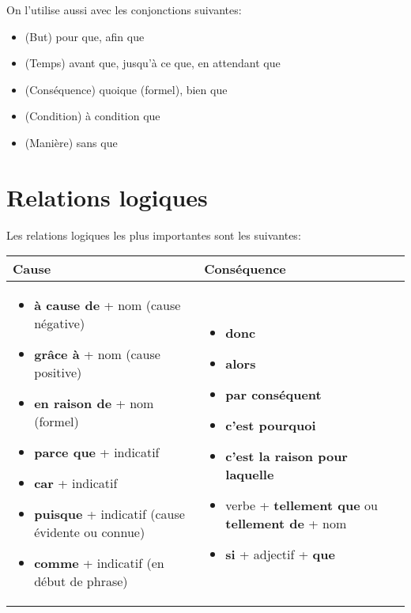 \documentclass{report}
\begin{document}
On l'utilise aussi avec les conjonctions suivantes:
\begin{itemize}
    \item (But) pour que, afin que
    \item (Temps) avant que, jusqu’à ce que, en attendant que
    \item (Conséquence) quoique (formel), bien que
    \item (Condition) à condition que
    \item (Manière) sans que
\end{itemize}


\chapter{Relations logiques}
Les relations logiques les plus importantes sont les suivantes:

\begin{center}
    \begin{tabular}{|p{}|p{}|}
        \hline
        \textbf{Cause} & \textbf{Conséquence} \\
        \hline
        \begin{itemize}
            \item \textbf{à cause de} + nom (cause négative)
            \item \textbf{grâce à} + nom (cause positive)
            \item \textbf{en raison de} + nom (formel)
            \item \textbf{parce que} + indicatif
            \item \textbf{car} + indicatif
            \item \textbf{puisque} + indicatif (cause évidente ou connue)
            \item \textbf{comme} + indicatif (en début de phrase)
        \end{itemize} 
        & 
        \begin{itemize}
            \item \textbf{donc}
            \item \textbf{alors}
            \item \textbf{par conséquent}
            \item \textbf{c'est pourquoi}
            \item \textbf{c'est la raison pour laquelle}
            \item verbe + \textbf{tellement que} ou \textbf{tellement de} + nom
            \item \textbf{si} + adjectif + \textbf{que}
        \end{itemize} \\
        \hline
        \end{tabular}    
\end{center}
\end{document}

